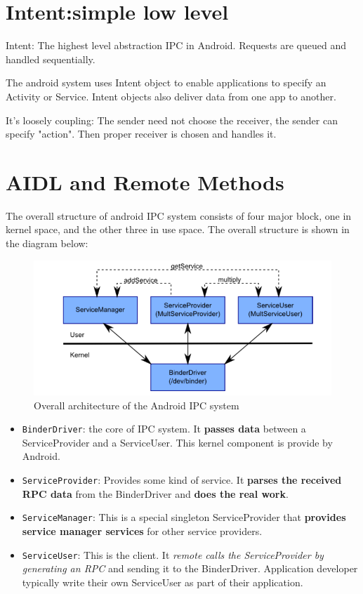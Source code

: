 \documentclass[11pt, a4paper]{book}
\begin{document}
\section{Intent:simple low level}
Intent: The highest level abstraction IPC in Android. Requests are queued and
handled sequentially.

The android system uses Intent object to enable applications to specify an
Activity or Service. Intent objects also deliver data from one app to another.

It's loosely coupling: The sender need not choose the receiver, the sender can
specify "action". Then proper receiver is chosen and handles it.
\section{AIDL and Remote Methods}
The overall structure of android IPC system consists of four major block, one in
kernel space, and the other three in use space. The overall structure is shown
in the diagram below:
\begin{figure}
    \centering
    \includegraphics[scale=0.5]{IPC_structure.png}
    \caption{Overall architecture of the Android IPC system}
\end{figure}
\begin{itemize}
    \item \verb|BinderDriver|: the core of IPC system. It \textbf{passes data} between a
        ServiceProvider and a ServiceUser. This kernel component is provide by
        Android.
    \item \verb|ServiceProvider|: Provides some kind of service. It \textbf{parses the
        received RPC data} from the BinderDriver and \textbf{does the real
        work}.
    \item \verb|ServiceManager|: This is a special singleton ServiceProvider
        that \textbf{provides service manager services} for other service providers.
    \item \verb|ServiceUser|: This is the client. It \emph{remote calls the
        ServiceProvider by generating an RPC} and sending it to the
        BinderDriver. Application developer typically write their own
        ServiceUser as part of their application.

\end{itemize}
\end{document}
